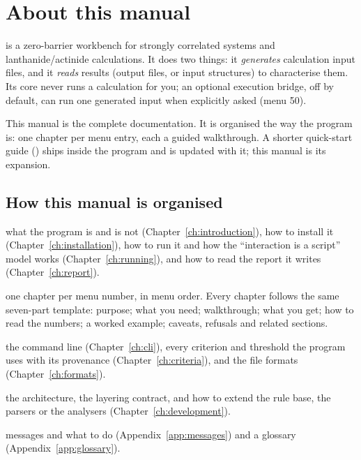 \chapter*{About this manual}

\fbk{} is a zero-barrier workbench for strongly correlated systems and
lanthanide/actinide calculations. It does two things: it \emph{generates}
calculation input files, and it \emph{reads} results (output files, or input
structures) to characterise them. Its core never runs a calculation for you; an
optional execution bridge, off by default, can run one generated input when
explicitly asked (menu 50).

This manual is the complete documentation. It is organised the way the program
is: one chapter per menu entry, each a guided walkthrough. A shorter quick-start
guide () ships inside the program and is updated with
it; this manual is its expansion.

\section*{How this manual is organised}

\begin{description}[leftmargin=1.6em]
  \item[Part I -- Getting started] what the program is and is not
    (Chapter~\ref{ch:introduction}), how to install it
    (Chapter~\ref{ch:installation}), how to run it and how the
    ``interaction is a script'' model works (Chapter~\ref{ch:running}), and how
    to read the report it writes (Chapter~\ref{ch:report}).
  \item[Part II -- Functions, menu by menu] one chapter per menu number, in
    menu order. Every chapter follows the same seven-part template: purpose;
    what you need; walkthrough; what you get; how to read the numbers; a worked
    example; caveats, refusals and related sections.
  \item[Part III -- Reference] the command line
    (Chapter~\ref{ch:cli}), every criterion and threshold the program uses with
    its provenance (Chapter~\ref{ch:criteria}), and the file formats
    (Chapter~\ref{ch:formats}).
  \item[Part IV -- Development] the architecture, the layering contract, and
    how to extend the rule base, the parsers or the analysers
    (Chapter~\ref{ch:development}).
  \item[Appendices] messages and what to do (Appendix~\ref{app:messages}) and a
    glossary (Appendix~\ref{app:glossary}).
\end{description}

